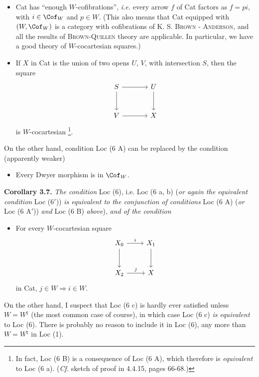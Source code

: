\begin{itemize}[leftmargin=7em, labelwidth=6em]
\item[\textbf{Loc (6 A)}] Cat has ``enough $W$-cofibrations'',
\textit{i.e.} every arrow $f$ of Cat factors as $f = pi$, with $i \in \Cof_W$ and $p \in W$. (This also means that Cat equipped with $(W, \Cof_W)$ is a category with cofibrations of K. S. \textsc{Brown} - \textsc{Anderson}, and all the results of \textsc{Brown-Quillen} theory are applicable. In particular, we have a good theory of $W$-cocartesian squares.)
\item[\textbf{Loc (6 B)}] If $X$ in Cat is the union of two opens $U$, $V$, with intersection $S$, then the square
\[
\begin{tikzcd}[ampersand replacement=\&, row sep=large, column sep=large]
S \arrow[r] \arrow[d] \& U \arrow[d] \\
V \arrow[r] \& X
\end{tikzcd}
\]
is $W$-cocartesian \footnote[19]{In fact, Loc (6 B) is a consequence of Loc (6 A), which therefore is \textit{equivalent} to Loc (6 a). (\textit{Cf.} sketch of proof in 4.4.15, pages 66-68.)}.
\end{itemize}
On the other hand, condition Loc (6 A) can be replaced by the condition (apparently weaker)
\begin{itemize}[leftmargin=7em, labelwidth=6em]
\item[\textbf{Loc (6 A$'$)}] Every Dwyer morphism is in $\Cof_W$.
\end{itemize}
\textbf{Corollary 3.7.} \textit{The condition} Loc (6), i.e. Loc (6 a, b) (\textit{or again the equivalent condition} Loc (6$'$)) \textit{is equivalent to the conjunction of conditions} Loc (6 A) (\textit{or} Loc (6 A$'$)) \textit{and} Loc (6 B) \textit{above}), \textit{and of the condition}
\begin{itemize}[leftmargin=7em, labelwidth=6em]
\item[\textbf{Loc (6 C)}] For every $W$-cocartesian square
\[
\begin{tikzcd}[ampersand replacement=\&, row sep=large]
X_0 \arrow[r, "i"] \arrow[d] \& X_1 \arrow[d] \\
X_2 \arrow[r, "j"] \& X
\end{tikzcd}
\]
in Cat, $j \in W \Longrightarrow i \in W$.
\end{itemize}
On the other hand, I suspect that Loc (6 c) is hardly ever satisfied unless $W = W^{\natural}$ (the most common case of course), in which case Loc (6 c) \textit{is equivalent} to Loc (6). There is probably no reason to include it in Loc (6), any more than $W = W^{\natural}$ in Loc (1).